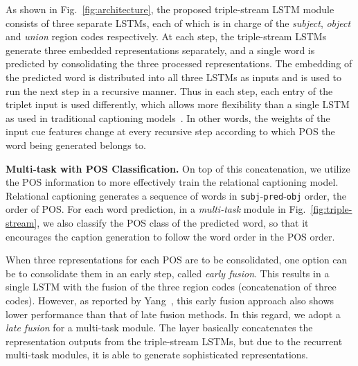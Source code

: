 \documentclass[10pt,twocolumn,letterpaper]{article}
\begin{document}
As shown in Fig.~\ref{fig:architecture}, the proposed triple-stream LSTM module consists of three separate LSTMs, each of which is in charge of the \emph{subject}, \emph{object} and \emph{union} region codes respectively.
At each step, the triple-stream LSTMs generate three embedded representations separately, and a single word is predicted by consolidating the three processed representations.
The embedding of the predicted word is distributed into all three LSTMs as inputs and is used to run the next step in a recursive manner.
Thus in each step, each entry of the triplet input is used differently, which allows more flexibility than a single LSTM as used in traditional captioning models~\cite{johnson2016densecap,vinyals2015show}.
In other words, the weights of the input cue features change at every recursive step according to which POS the word being generated belongs to. 










\vspace{1mm}\noindent\textbf{Multi-task with POS Classification.}\quad
On top of this concatenation, we utilize the POS information to more effectively train the relational captioning model. 
Relational captioning generates a sequence of words in \texttt{subj}-\texttt{pred}-\texttt{obj} order, \ie the order of POS.
For each word prediction, in a \emph{multi-task} module in Fig.~\ref{fig:triple-stream}, we also classify the POS class of the predicted word, so that it encourages the caption generation to follow the word order in the POS order.

When three representations {for each POS} are to be consolidated, one option can be to consolidate them in an early step, called \emph{early fusion}.
This results in a single LSTM with the fusion of the three region codes (\eg concatenation of three codes).
However, as reported by Yang~\etal\cite{Yang_2017_CVPR}, this early fusion approach also shows lower performance than that of late fusion methods.
In this regard, we adopt a \emph{late fusion} for a multi-task module.
The layer basically concatenates the representation outputs from the triple-stream LSTMs, but due to the recurrent multi-task modules, it is able to generate sophisticated representations.
\end{document}
